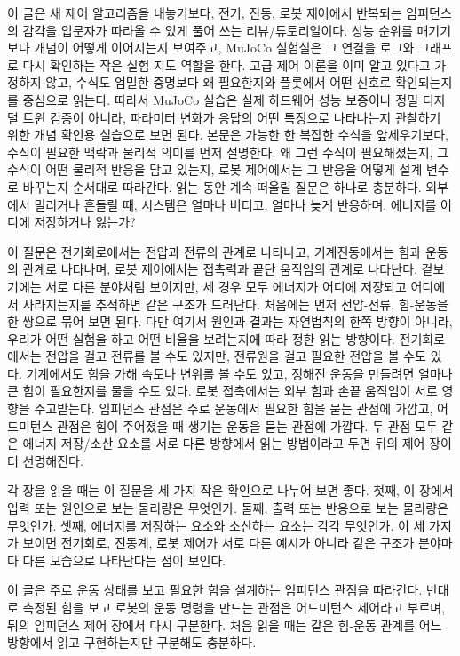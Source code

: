 이 글은 새 제어 알고리즘을 내놓기보다, 전기, 진동, 로봇 제어에서 반복되는 임피던스의 감각을 입문자가 따라올 수 있게 풀어 쓰는 리뷰/튜토리얼이다.
성능 순위를 매기기보다 개념이 어떻게 이어지는지 보여주고, MuJoCo 실험실은 그 연결을 로그와 그래프로 다시 확인하는 작은 실험 지도 역할을 한다.
고급 제어 이론을 이미 알고 있다고 가정하지 않고, 수식도 엄밀한 증명보다 왜 필요한지와 플롯에서 어떤 신호로 확인되는지를 중심으로 읽는다.
따라서 MuJoCo 실습은 실제 하드웨어 성능 보증이나 정밀 디지털 트윈 검증이 아니라, 파라미터 변화가 응답의 어떤 특징으로 나타나는지 관찰하기 위한 개념 확인용 실습으로 보면 된다.
본문은 가능한 한 복잡한 수식을 앞세우기보다, 수식이 필요한 맥락과 물리적 의미를 먼저 설명한다.
왜 그런 수식이 필요해졌는지, 그 수식이 어떤 물리적 반응을 담고 있는지, 로봇 제어에서는 그 반응을 어떻게 설계 변수로 바꾸는지 순서대로 따라간다.
읽는 동안 계속 떠올릴 질문은 하나로 충분하다.
외부에서 밀리거나 흔들릴 때, 시스템은 얼마나 버티고, 얼마나 늦게 반응하며, 에너지를 어디에 저장하거나 잃는가?

이 질문은 전기회로에서는 전압과 전류의 관계로 나타나고, 기계진동에서는 힘과 운동의 관계로 나타나며, 로봇 제어에서는 접촉력과 끝단 움직임의 관계로 나타난다.
겉보기에는 서로 다른 분야처럼 보이지만, 세 경우 모두 에너지가 어디에 저장되고 어디에서 사라지는지를 추적하면 같은 구조가 드러난다.
처음에는 먼저 전압-전류, 힘-운동을 한 쌍으로 묶어 보면 된다.
다만 여기서 원인과 결과는 자연법칙의 한쪽 방향이 아니라, 우리가 어떤 실험을 하고 어떤 비율을 보려는지에 따라 정한 읽는 방향이다.
전기회로에서는 전압을 걸고 전류를 볼 수도 있지만, 전류원을 걸고 필요한 전압을 볼 수도 있다.
기계에서도 힘을 가해 속도나 변위를 볼 수도 있고, 정해진 운동을 만들려면 얼마나 큰 힘이 필요한지를 물을 수도 있다.
로봇 접촉에서는 외부 힘과 손끝 움직임이 서로 영향을 주고받는다.
임피던스 관점은 주로 운동에서 필요한 힘을 묻는 관점에 가깝고, 어드미턴스 관점은 힘이 주어졌을 때 생기는 운동을 묻는 관점에 가깝다.
두 관점 모두 같은 에너지 저장/소산 요소를 서로 다른 방향에서 읽는 방법이라고 두면 뒤의 제어 장이 더 선명해진다.

각 장을 읽을 때는 이 질문을 세 가지 작은 확인으로 나누어 보면 좋다.
첫째, 이 장에서 입력 또는 원인으로 보는 물리량은 무엇인가.
둘째, 출력 또는 반응으로 보는 물리량은 무엇인가.
셋째, 에너지를 저장하는 요소와 소산하는 요소는 각각 무엇인가.
이 세 가지가 보이면 전기회로, 진동계, 로봇 제어가 서로 다른 예시가 아니라 같은 구조가 분야마다 다른 모습으로 나타난다는 점이 보인다.

이 글은 주로 운동 상태를 보고 필요한 힘을 설계하는 임피던스 관점을 따라간다.
반대로 측정된 힘을 보고 로봇의 운동 명령을 만드는 관점은 어드미턴스 제어라고 부르며, 뒤의 임피던스 제어 장에서 다시 구분한다.
처음 읽을 때는 같은 힘-운동 관계를 어느 방향에서 읽고 구현하는지만 구분해도 충분하다.

